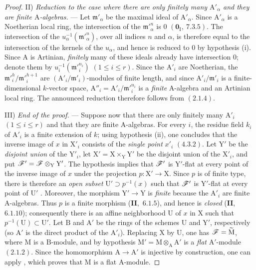 \begin{proof}
\medskip
\noindent II) \emph{Reduction to the case where there are only finitely many $\mathrm{A}'_\alpha$ and they are finite $\mathrm{A}$-algebras.} --- Let $\mathfrak{m}'_\alpha$ be
the maximal ideal of $\mathrm{A}'_\alpha$. Since $\mathrm{A}'_\alpha$ is a Noetherian local ring, the intersection of the $\mathfrak{m}'^n_\alpha$
is $0$ $(\mathbf{0}_\mathrm{I},~7.3.5)$. The intersection of the $u_\alpha^{-1}(\mathfrak{m}'^n_\alpha)$, over all indices $n$ and $\alpha$, is therefore
equal to the intersection of the kernels of the $u_\alpha$, and hence is reduced to $0$ by hypothesis (i). Since $\mathrm{A}$
is Artinian, \emph{finitely} many of these ideals already have intersection $0$; denote them by
$u_i^{-1}(\mathfrak{m}'^{n_i}_i)$ $(1\leq i\leq r)$. Since the $\mathrm{A}'_i$ are Noetherian, the $\mathfrak{m}'^h_i/\mathfrak{m}'^{h+1}_i$ are
$(\mathrm{A}'_i/\mathfrak{m}'_i)$-modules of finite length, and since $\mathrm{A}'_i/\mathfrak{m}'_i$ is a finite-dimensional $k$-vector space,
$\mathrm{A}''_i=\mathrm{A}'_i/\mathfrak{m}'^{n_i}_i$ is a \emph{finite} $\mathrm{A}$-algebra and an Artinian local ring. The announced reduction
therefore follows from $(2.1.4)$.

\medskip
\noindent III) \emph{End of the proof.} --- Suppose now that there are only finitely many $\mathrm{A}'_i$ $(1\leq i\leq r)$ and that
they are finite $\mathrm{A}$-algebras. For every $i$, the residue field $k_i$ of $\mathrm{A}'_i$ is a finite extension of $k$; using
hypothesis (ii), one concludes that the inverse image of $x$ in $\mathrm{X}'_i$ consists of the \emph{single point} $x'_i$ $(4.3.2)$.
Let $\mathrm{Y}'$ be the \emph{disjoint union} of the $\mathrm{Y}'_i$, let $\mathrm{X}'=\mathrm{X}\times_\mathrm{Y}\mathrm{Y}'$ be the disjoint union of the
$\mathrm{X}'_i$, and put $\mathscr{F}'=\mathscr{F}\otimes_\mathrm{Y}\mathrm{Y}'$. The hypothesis implies that $\mathscr{F}'$ is $\mathrm{Y}'$-flat at every
point of the inverse image of $x$ under the projection $p:\mathrm{X}'\to\mathrm{X}$. Since $p$ is of finite type, there is therefore an
\emph{open subset} $\mathrm{U}'\supset p^{-1}(x)$ such that $\mathscr{F}'$ is $\mathrm{Y}'$-flat at every point of $\mathrm{U}'$ .
Moreover, the morphism $\mathrm{Y}'\to\mathrm{Y}$ is \emph{finite} because the $\mathrm{A}'_i$ are finite $\mathrm{A}$-algebras. Thus $p$ is a finite
morphism (\textbf{II},~$6.1.5$), and hence is \emph{closed} (\textbf{II},~$6.1.10$); consequently there is an affine neighborhood $\mathrm{U}$ of
$x$ in $\mathrm{X}$ such that $p^{-1}(\mathrm{U})\subset\mathrm{U}'$. Let $\mathrm{B}$ and $\mathrm{A}'$ be the rings of the schemes
$\mathrm{U}$ and $\mathrm{Y}'$, respectively (so $\mathrm{A}'$ is the direct product of the $\mathrm{A}'_i$). Replacing $\mathrm{X}$ by
$\mathrm{U}$, one has $\mathscr{F}=\widetilde{\mathrm{M}}$, where $\mathrm{M}$ is a $\mathrm{B}$-module, and by hypothesis
$\mathrm{M}'=\mathrm{M}\otimes_\mathrm{A}\mathrm{A}'$ is a \emph{flat} $\mathrm{A}'$-module $(2.1.2)$. Since the homomorphism
$\mathrm{A}\to\mathrm{A}'$ is injective by construction, one can apply , which proves that $\mathrm{M}$ is a flat
$\mathrm{A}$-module.
\end{proof}

